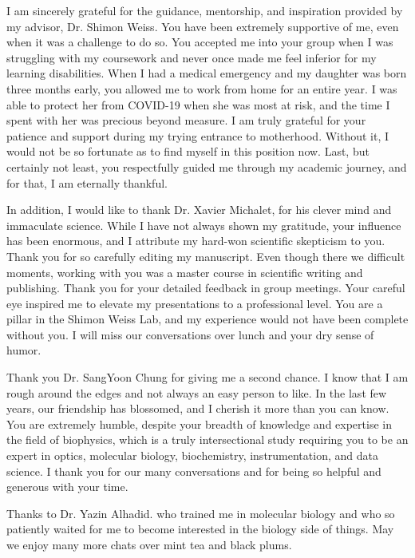 \vspace*{\fill}

I am sincerely grateful for the guidance, mentorship, and inspiration provided by my advisor, Dr. Shimon Weiss. 
You have been extremely supportive of me, even when it was a challenge to do so. 
You accepted me into your group when I was struggling with my coursework and never once made me feel inferior for my learning disabilities. 
When I had a medical emergency and my daughter was born three months early, 
you allowed me to work from home for an entire year.
I was able to protect her from COVID-19 when she was most at risk, and the time I spent with her was precious beyond measure.
I am truly grateful for your patience and support during my trying entrance to motherhood.
Without it, I would not be so fortunate as to find myself in this position now.
Last, but certainly not least, you respectfully guided me through my academic journey, and for that, I am eternally thankful. 

In addition, I would like to thank Dr. Xavier Michalet, for his clever mind and immaculate science.
While I have not always shown my gratitude, your influence has been enormous, and I attribute my hard-won scientific skepticism to you. 
Thank you for so carefully editing my manuscript.
Even though there we difficult moments, working with you was a master course in scientific writing and publishing. 
Thank you for your detailed feedback in group meetings.
Your careful eye inspired me to elevate my presentations to a professional level.
You are a pillar in the Shimon Weiss Lab, and my experience would not have been complete without you.
I will miss our conversations over lunch and your dry sense of humor. 

Thank you Dr. SangYoon Chung for giving me a second chance. 
I know that I am rough around the edges and not always an easy person to like.
In the last few years, our friendship has blossomed, and I cherish it more than you can know. 
You are extremely humble, despite your breadth of knowledge and expertise in the field of biophysics, which is a truly intersectional study requiring you to be an expert in optics, molecular biology, biochemistry, instrumentation, and data science. 
I thank you for our many conversations and for being so helpful and generous with your time.

Thanks to Dr. Yazin Alhadid.
who trained me in molecular biology and who so patiently waited for me to become interested in the biology side of things. 
May we enjoy many more chats over mint tea and black plums. 

